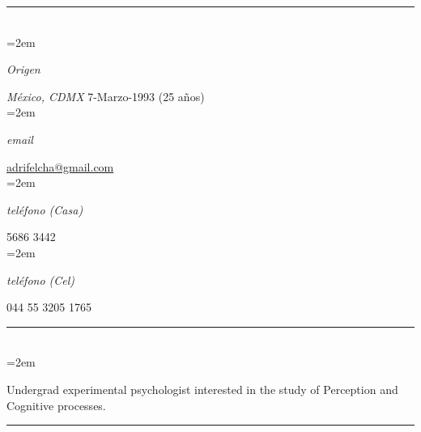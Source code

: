 \documentclass{scrartcl}
\newlength{\datebox}\settowidth{\datebox}{September 2017} %
\newcommand{\NewEntry}[3]{\noindent\hangindent=2em\hangafter=0 \parbox{\datebox}{\small \textit{#1}}\hspace{1.5em} #2 #3 %
\vspace{0.5em}} %
\newcommand{\Description}[1]{\hangindent=2em\hangafter=0\noindent\raggedright\footnotesize{#1}\par\normalsize\vspace{1em}} %
\begin{document}
\thispagestyle{empty} %


\begin{cv}{\textbf{}}\vspace{1.5em} %

\hrule{}\vspace{1.5em}

\noindent{}\vspace{0.1em}\\ %

\NewEntry{Origen}{\textit{México, CDMX}}{7-Marzo-1993 (25 años)}\\ %
\NewEntry{email}{\href{mailto:adrifelcha@gmail.com}{adrifelcha@gmail.com}}\\ %
\NewEntry{teléfono (Casa)}{5686 3442}\\ %
\NewEntry{teléfono (Cel)}{044 55 3205 1765}\\%

\hrule{}\vspace{1.5em}

\noindent{}\vspace{0.1em}\\ %

\Description{Undergrad experimental psychologist interested in the study of Perception and Cognitive processes.}\vspace{1em} %

\hrule{}\vspace{1.5em}



\end{cv}
\end{document}
